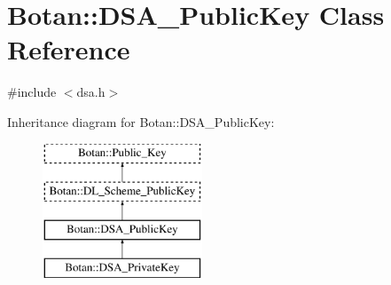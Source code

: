 \hypertarget{classBotan_1_1DSA__PublicKey}{\section{Botan\-:\-:D\-S\-A\-\_\-\-Public\-Key Class Reference}
\label{classBotan_1_1DSA__PublicKey}
}


{\ttfamily \#include $<$dsa.\-h$>$}

Inheritance diagram for Botan\-:\-:D\-S\-A\-\_\-\-Public\-Key\-:\begin{figure}[H]
\begin{center}
\leavevmode
\includegraphics[height=4.000000cm]{classBotan_1_1DSA__PublicKey}
\end{center}
\end{figure}
